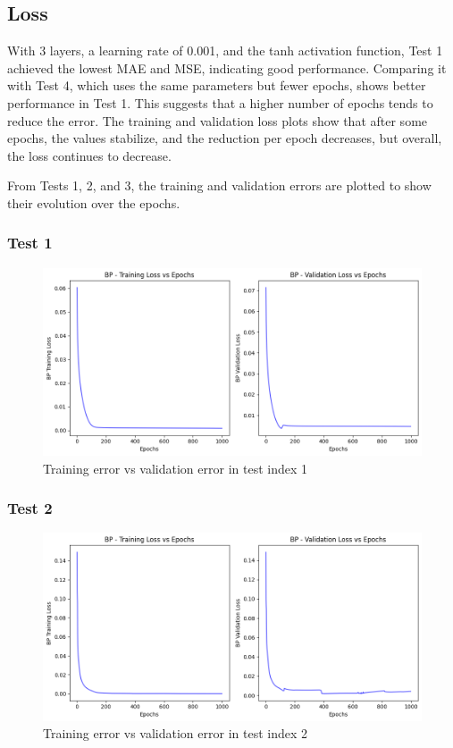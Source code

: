 \documentclass[11pt, a4paper]{article}
\begin{document}
\subsection{Loss}

With 3 layers, a learning rate of 0.001, and the tanh activation function, Test 1 achieved the lowest MAE and MSE, indicating good performance. 
Comparing it with Test 4, which uses the same parameters but fewer epochs, shows better performance in Test 1. This suggests that a higher number of 
epochs tends to reduce the error. The training and validation loss plots show that after some epochs, the values stabilize, and the reduction per epoch decreases, 
but overall, the loss continues to decrease.

\vspace{1em}From Tests 1, 2, and 3, the training and validation errors are plotted to show their evolution over the epochs.

\subsubsection{Test 1}

\begin{figure}[H]
    \centering
    \includegraphics[width=440pt]{images/test1_error.png}
    \caption{Training error vs validation error in test index 1}
    \label{fig:image_error_test_1}
\end{figure}

\subsubsection{Test 2}

\begin{figure}[H]
    \centering
    \includegraphics[width=440pt]{images/test2_error.png}
    \caption{Training error vs validation error in test index 2}
    \label{fig:image_error_test_2}
\end{figure}
\end{document}
